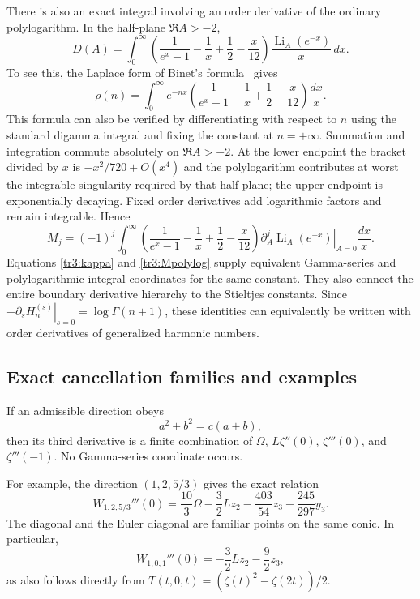 There is also an exact integral involving an order derivative of the
ordinary polylogarithm.  In the half-plane $\Re A>-2$,
\begin{equation}\label{tr3:Dpolylog}
 D(A)=\int_0^\infty
 \left(\frac1{e^x-1}-\frac1x+\frac12-\frac{x}{12}\right)
           \frac{\operatorname{Li}_A(e^{-x})}{x}\,dx.
\end{equation}
To see this, the Laplace form of Binet's formula~\cite[\S5.9]{tr3:DLMF} gives
\[
 \rho(n)=\int_0^\infty e^{-nx}
 \left(\frac1{e^x-1}-\frac1x+\frac12-\frac{x}{12}\right)\frac{dx}{x}.
\]
This formula can also be verified by differentiating with respect to
$n$ using the standard digamma integral and fixing the constant at
$n=+\infty$.  Summation and integration commute absolutely on
$\Re A>-2$.  At the lower endpoint the bracket divided by $x$ is
$-x^2/720+O(x^4)$ and the polylogarithm contributes at worst the
integrable singularity required by that half-plane; the upper endpoint
is exponentially decaying.  Fixed order derivatives add logarithmic
factors and remain integrable.  Hence
\begin{equation}\label{tr3:Mpolylog}
 M_j=(-1)^j\int_0^\infty
 \left(\frac1{e^x-1}-\frac1x+\frac12-\frac{x}{12}\right)
 \left.\partial_A^j\operatorname{Li}_A(e^{-x})\right|_{A=0}\frac{dx}{x}.
\end{equation}
Equations \eqref{tr3:kappa} and \eqref{tr3:Mpolylog} supply equivalent
Gamma-series and polylogarithmic-integral coordinates for the same
constant.  They also connect the entire boundary derivative hierarchy
to the Stieltjes constants.  Since
$-\left.\partial_s H_n^{(s)}\right|_{s=0}=\log\Gamma(n+1)$,
these identities can equivalently be written with order derivatives of
generalized harmonic numbers.

\subsection{Exact cancellation families and examples}

\begin{corollary}\label{tr3:conic}
If an admissible direction obeys
\begin{equation}\label{tr3:coniceq}
 a^2+b^2=c(a+b),
\end{equation}
then its third derivative is a finite combination of
$\Omega$, $L\zeta''(0)$, $\zeta'''(0)$, and $\zeta'''(-1)$.
No Gamma-series coordinate occurs.
\end{corollary}

For example, the direction $(1,2,5/3)$ gives the exact relation
\begin{equation}\label{tr3:conicexample}
 W_{1,2,5/3}'''(0)=\frac{10}{3}\Omega
 -\frac32Lz_2-\frac{403}{54}z_3-\frac{245}{297}y_3.
\end{equation}
The diagonal and the Euler diagonal are familiar points on the same
conic.  In particular,
\[
 W_{1,0,1}'''(0)=-\frac32Lz_2-\frac92z_3,
\]
as also follows directly from
$T(t,0,t)=(\zeta(t)^2-\zeta(2t))/2$.

